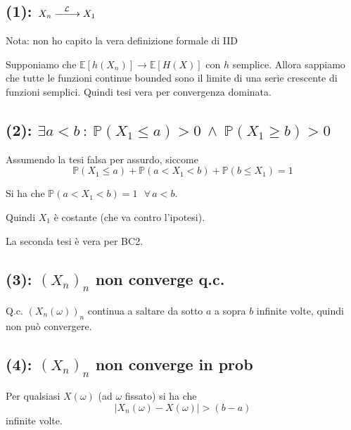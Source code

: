 \documentclass{article}
\newcommand{\myrightarrow}[1]{\xrightarrow{\makebox[2em][c]{$\scriptstyle#1$}}}
\newcommand{\convlegge}{\myrightarrow{\mathcal{L}}}
\begin{document}
\subsection{(1): $X_n \convlegge X_1$}
Nota: non ho capito la vera definizione formale di IID

Supponiamo che $\mathbb{E}\left[h(X_n)\right] \longrightarrow \mathbb{E}\left[H(X)\right]$ con $h$ semplice. Allora sappiamo che tutte le funzioni continue bounded sono il limite di una serie crescente di funzioni semplici. Quindi tesi vera per convergenza dominata.


\subsection{(2): $\exists  a<b \ : \ \mathbb{P}\left(X_1\leq a\right) > 0 \ \land  \ \mathbb{P}\left(X_1\geq b\right) > 0$}
Assumendo la tesi falsa per assurdo, siccome
\[
	\mathbb{P}\left(X_1\leq a\right) + \mathbb{P}\left(a < X_1 < b\right) + \mathbb{P}\left(b\leq X_1\right) = 1
\]

Si ha che $\mathbb{P}\left(a < X_1 < b\right) = 1\ \ \ \forall\, a<b$.

Quindi $X_1$ è costante (che va contro l'ipotesi).

La seconda tesi è vera per BC2.

\subsection{(3): $\left(X_n\right)_n$ non converge q.c.}
Q.c. $\left(X_n (\omega )\right)_n$ continua a saltare da sotto $a$ a sopra $b$ infinite volte, quindi non può convergere.

\subsection{(4): $\left(X_n\right)_n$ non converge in prob}
Per qualsiasi $X(\omega )$ (ad $\omega $ fissato) si ha che 
\[
	\left|X_n(\omega ) - X\left(\omega \right)\right| > \left(b-a\right)
\]
infinite volte.
\end{document}
